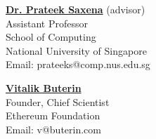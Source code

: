 \documentclass[margin,line]{res}
\begin{document}
\begin{resume}
\begin{minipage}[t]{0.48\textwidth}
\href{http://www.comp.nus.edu.sg/~prateeks}{\textbf{Dr. Prateek Saxena}} (advisor)\\
Assistant Professor\\
School of Computing\\
National University of Singapore\\
Email: \textsf{prateeks@comp.nus.edu.sg}\\
\end{minipage}%
\begin{minipage}[t]{0.48\textwidth}
\href{http://buterin.com/}{\textbf{Vitalik Buterin}}\\
Founder, Chief Scientist\\
Ethereum Foundation\\
Email: \textsf{v@buterin.com}\\
\end{minipage}

\end{resume}
\end{document}

